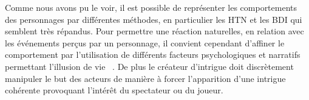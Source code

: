 \documentclass[asi]{picINSA}
\begin{document}
Comme nous avons pu le voir, il est possible de représenter les comportements des personnages par différentes méthodes,
 en particulier les HTN et les BDI qui semblent très répandus. Pour permettre une réaction naturelles, en relation avec
 les événements perçus par un personnage, il convient cependant d'affiner le comportement par l'utilisation de
 différents facteurs psychologiques et narratifs permettant l'illusion de vie ~\cite{Bates94therole}.
 De plus le créateur d'intrigue doit discrètement manipuler le but des acteurs de manière à forcer l'apparition d'une
 intrigue cohérente provoquant l'intérêt du spectateur ou du joueur. ~\cite{riedl2004intent}

{}

\end{document}
